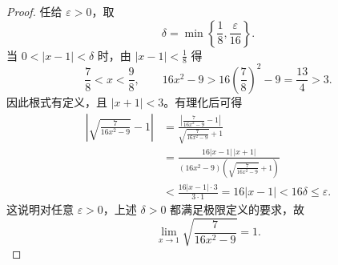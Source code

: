 \documentclass[UTF8,12pt,a4paper,fontset=fandol]{ctexart}
\begin{document}
\begin{proof}

任给 $\varepsilon>0$，取
\[
  \delta=\min\left\{\frac18,\frac{\varepsilon}{16}\right\}.
\]
当 $0<|x-1|<\delta$ 时，由 $|x-1|<\frac18$ 得
\[
  \frac78<x<\frac98,
  \qquad
  16x^2-9>16\left(\frac78\right)^2-9=\frac{13}{4}>3.
\]
因此根式有定义，且 $|x+1|<3$。有理化后可得
\begin{align*}
  \left|\sqrt{\frac{7}{16x^2-9}}-1\right|
  &=\frac{\left|\frac{7}{16x^2-9}-1\right|}
          {\sqrt{\frac{7}{16x^2-9}}+1}\\
  &=\frac{16|x-1|\,|x+1|}
          {(16x^2-9)\left(\sqrt{\frac{7}{16x^2-9}}+1\right)}\\
  &<\frac{16|x-1|\cdot3}{3\cdot1}
   =16|x-1|
   <16\delta
   \leq\varepsilon.
\end{align*}
这说明对任意 $\varepsilon>0$，上述 $\delta>0$ 都满足极限定义的要求，故
\[
  \lim_{x\to1}\sqrt{\frac{7}{16x^2-9}}=1.
\]
\end{proof}
\end{document}
